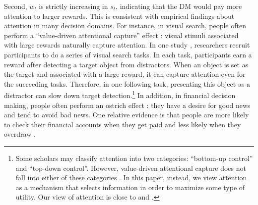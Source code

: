 \documentclass[
  12pt,
]{article}
\begin{document}
Second, \(w_t\) is strictly increasing in \(s_t\), indicating that the
DM would pay more attention to larger rewards. This is consistent with
empirical findings about attention in many decision domains. For
instance, in visual search, people often perform a ``value-driven
attentional capture'' effect
\citep{della2009learning, hickey2010reward, anderson2011value, chelazzi2013rewards, jahfari2017sensitivity}:
visual stimuli associated with large rewards naturally capture
attention. In one study \citep{anderson2011value}, researchers recruit
participants to do a series of visual search tasks. In each task,
participants earn a reward after detecting a target object from
distractors. When an object is set as the target and associated with a
large reward, it can capture attention even for the succeeding tasks.
Therefore, in one following task, presenting this object as a distractor
can slow down target detection.\footnote{Some scholars may classify
  attention into two categories: ``bottom-up control'' and ``top-down
  control''. However, value-driven attentional capture does not fall
  into either of these categories \citep{awh2012top}. In this paper,
  instead, we view attention as a mechanism that selects information in
  order to maximize some type of utility. Our view of attention is close
  to \citet{gottlieb2012attention} and \citet{gottlieb2013information}.}
In addition, in financial decision making, people often perform an
ostrich effect \citep{galai2006ostrich, karlsson2009ostrich}: they have
a desire for good news and tend to avoid bad news. One relative evidence
is that people are more likely to check their financial accounts when
they get paid and less likely when they overdraw
\citep{olafsson2017ostrich}.
\end{document}
